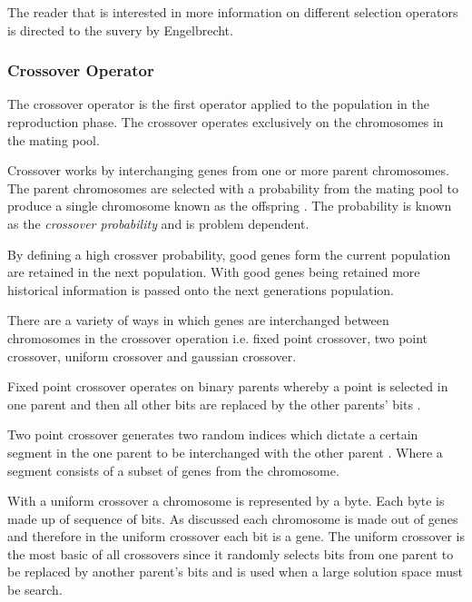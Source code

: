 The reader that is interested in more information on different selection operators is directed to the suvery by Engelbrecht\cite{CompuIntelligenceIntro}.
\subsubsection{Crossover Operator}
\label{sec:crossover}
The crossover operator is the first operator applied to the population in the reproduction phase. The crossover operates exclusively on the chromosomes in the mating pool. 

Crossover works by interchanging genes from one or more parent chromosomes. The parent chromosomes are selected with a probability from the mating pool to produce a single chromosome known as the offspring \cite{FamilyGA,HumanPassiveGA,CoactiveFuzzyGA}. The probability is known as the \emph{crossover probability} and is problem dependent\cite{CompuIntelligenceIntro}.

By defining a high crossver probability, good genes form the current population are retained in the next population\cite{CompuIntelligenceIntro}. With good genes being retained more historical information is passed onto the next generations population\cite{FamilyGA}.

There are a variety of ways in which genes are interchanged between chromosomes in the crossover operation i.e. fixed point crossover, two point crossover, uniform crossover and gaussian crossover\cite{CompuIntelligenceIntro}. 

Fixed point crossover operates on binary parents whereby a point is selected in one parent and then all other bits are replaced by the other parents' bits \cite{HumanPassiveGA}. 

Two point crossover generates two random indices which dictate a certain segment in the one parent to be interchanged with the other parent \cite{ConstrainedGA}. Where a segment consists of a subset of genes from the chromosome. 

With a uniform crossover a chromosome is represented by a byte\cite{CompuIntelligenceIntro}. Each byte is made up of sequence of bits. As discussed each chromosome is made out of genes and therefore in the uniform crossover each bit is a gene\cite{CompuIntelligenceIntro}. The uniform crossover is the most basic of all crossovers since it randomly selects bits from one parent to be replaced by another parent's bits and is used when a large solution space must be search\cite{ParallelGASA,GeostatisticalGA}. 

